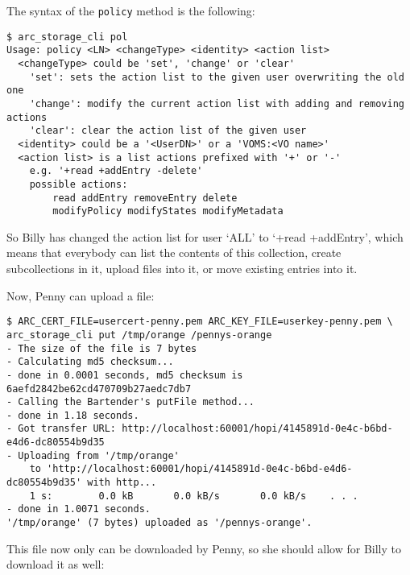 \documentclass{article}
\begin{document}
The syntax of the \verb!policy! method is the following:

\begin{verbatim}
$ arc_storage_cli pol
Usage: policy <LN> <changeType> <identity> <action list>
  <changeType> could be 'set', 'change' or 'clear'
    'set': sets the action list to the given user overwriting the old one
    'change': modify the current action list with adding and removing actions
    'clear': clear the action list of the given user
  <identity> could be a '<UserDN>' or a 'VOMS:<VO name>'
  <action list> is a list actions prefixed with '+' or '-'
    e.g. '+read +addEntry -delete'
    possible actions:
        read addEntry removeEntry delete
        modifyPolicy modifyStates modifyMetadata
\end{verbatim}

So Billy has changed the action list for user `ALL' to `+read +addEntry', which means that everybody can list the contents of this collection, create subcollections in it, upload files into it, or move existing entries into it.

Now, Penny can upload a file:

\begin{verbatim}
$ ARC_CERT_FILE=usercert-penny.pem ARC_KEY_FILE=userkey-penny.pem \
arc_storage_cli put /tmp/orange /pennys-orange
- The size of the file is 7 bytes
- Calculating md5 checksum...
- done in 0.0001 seconds, md5 checksum is 6aefd2842be62cd470709b27aedc7db7
- Calling the Bartender's putFile method...
- done in 1.18 seconds.
- Got transfer URL: http://localhost:60001/hopi/4145891d-0e4c-b6bd-e4d6-dc80554b9d35
- Uploading from '/tmp/orange'
    to 'http://localhost:60001/hopi/4145891d-0e4c-b6bd-e4d6-dc80554b9d35' with http...
    1 s:        0.0 kB       0.0 kB/s       0.0 kB/s    . . .       
- done in 1.0071 seconds.
'/tmp/orange' (7 bytes) uploaded as '/pennys-orange'.
\end{verbatim}

This file now only can be downloaded by Penny, so she should allow for Billy to download it as well:
\end{document}

